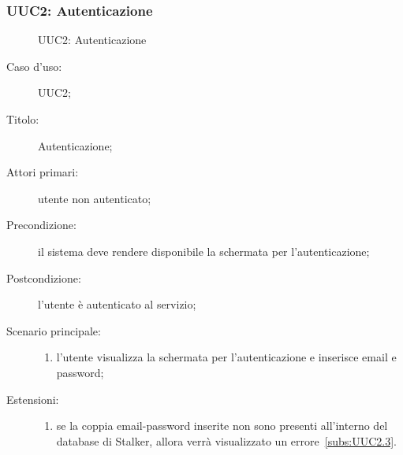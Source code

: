 \documentclass[../../../analisi-dei-requisiti.tex]{subfiles}
\begin{document}
\subsubsection{UUC2: Autenticazione}%
\label{subs:UUC2}

\begin{figure}[H]
  \centering
  \caption{UUC2: Autenticazione}%
  \label{fig:uuc2}
\end{figure}

\begin{description}
  \item[Caso d'uso:] UUC2;
  \item[Titolo:] Autenticazione;
  \item[Attori primari:] utente non autenticato;
  \item[Precondizione:] il sistema deve rendere disponibile la schermata per l'autenticazione;
  \item[Postcondizione:] l'utente è autenticato al servizio;
  \item[Scenario principale:]
        \begin{enumerate}
          \item l'utente visualizza la schermata per l'autenticazione e inserisce email e password;
        \end{enumerate}
  \item[Estensioni:]
        \begin{enumerate}
          \item se la coppia email-password inserite non sono presenti all'interno del database di Stalker, allora verrà visualizzato un errore~\ref{subs:UUC2.3}.
        \end{enumerate}
\end{description}
\end{document}
